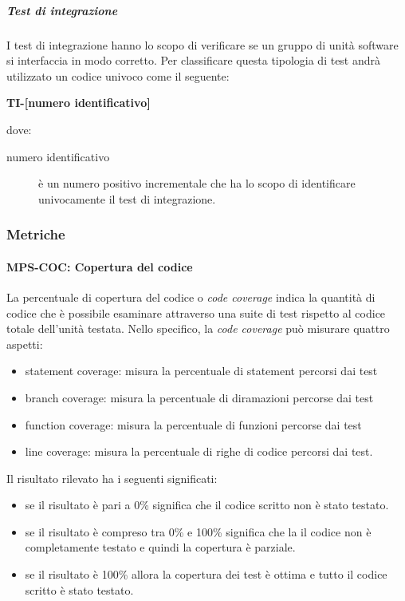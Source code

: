 \documentclass[../../norme-di-progetto.tex]{subfiles}
\begin{document}
\subparagraph{Test di integrazione}%
\label{subp:test_di_integrazione}
I test di integrazione hanno lo scopo di verificare se un gruppo di unità software si interfaccia in modo corretto.
Per classificare questa tipologia di test andrà utilizzato un codice univoco come il seguente:
\begin{center}
  \textbf{TI-[numero identificativo]}
\end{center}
dove:
\begin{description}
  \item [numero identificativo] è un numero positivo incrementale che ha lo scopo di identificare univocamente il test di integrazione.
\end{description}




\subsubsection{Metriche}%
\label{subs:verifica/metriche}

\paragraph{MPS-COC: Copertura del codice}%
\label{par:MPS-COC_copertura_codice}

La percentuale di copertura del codice o \textit{code coverage} indica la quantità di codice che è possibile esaminare attraverso una suite di test rispetto al codice totale dell'unità testata.
Nello specifico, la \textit{code coverage} può misurare quattro aspetti:
\begin{itemize}
  \item statement coverage: misura la percentuale di statement percorsi dai test
  \item branch coverage: misura la percentuale di diramazioni percorse dai test
  \item function coverage: misura la percentuale di funzioni percorse dai test
  \item line coverage: misura la percentuale di righe di codice percorsi dai test.
\end{itemize}

Il risultato rilevato ha i seguenti significati:
\begin{itemize}
  \item se il risultato è pari a 0\% significa che il codice scritto non è stato testato.
  \item se il risultato è compreso tra 0\% e 100\% significa che la il codice non è completamente testato e quindi la copertura è parziale.
  \item se il risultato è 100\% allora la copertura dei test è ottima e tutto il codice scritto è stato testato.
\end{itemize}
\end{document}
